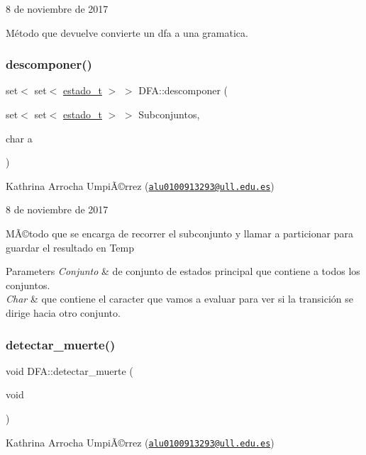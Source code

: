8 de noviembre de 2017

Método que devuelve convierte un dfa a una gramatica. \mbox{\label{class_d_f_a_a3c6637fde6efa43f75399b6407636cda}} 
\subsubsection{\texorpdfstring{descomponer()}{descomponer()}}
{\footnotesize\ttfamily set$<$ set$<$ \hyperlink{classestado__t}{estado\+\_\+t} $>$ $>$ D\+F\+A\+::descomponer (\begin{DoxyParamCaption}\item[{set$<$ set$<$ \hyperlink{classestado__t}{estado\+\_\+t} $>$ $>$}]{Subconjuntos,  }\item[{char}]{a }\end{DoxyParamCaption})}

Kathrina Arrocha UmpiÃ©rrez (\href{mailto:alu0100913293@ull.edu.es}{\tt alu0100913293@ull.\+edu.\+es})

8 de noviembre de 2017

MÃ©todo que se encarga de recorrer el subconjunto y llamar a particionar para guardar el resultado en Temp 
\begin{DoxyParams}{Parameters}
{\em Conjunto} & de conjunto de estados principal que contiene a todos los conjuntos. \\
\hline
{\em Char} & que contiene el caracter que vamos a evaluar para ver si la transición se dirige hacia otro conjunto. \\
\hline
\end{DoxyParams}
\mbox{\label{class_d_f_a_abaac46234616f0feda45b0a91ce78d39}} 
\subsubsection{\texorpdfstring{detectar\+\_\+muerte()}{detectar\_muerte()}}
{\footnotesize\ttfamily void D\+F\+A\+::detectar\+\_\+muerte (\begin{DoxyParamCaption}\item[{void}]{ }\end{DoxyParamCaption})}

Kathrina Arrocha UmpiÃ©rrez (\href{mailto:alu0100913293@ull.edu.es}{\tt alu0100913293@ull.\+edu.\+es})

